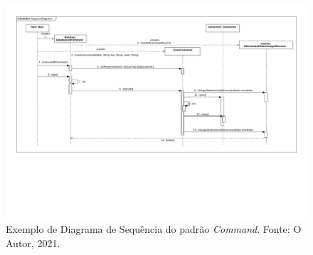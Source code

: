\documentclass[12pt, a4paper]{article}
\newcommand{\tit}[1]{\textit{#1}}
\begin{document}
\begin{enumerate}[label=\textbf{\arabic*.}]
           \begin{figure}[!ht]
              \centering
              \includegraphics[width=\textwidth, trim = 1cm 6cm 1cm 1cm, clip]{3b.pdf}
                \caption{Exemplo de Diagrama de Sequência do padrão \tit{Command}. Fonte: O Autor, 2021.}
              \label{fig:question3b}
          \end{figure}
        

\end{enumerate}
\end{document}
